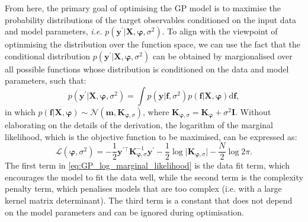 From here, the primary goal of optimising the GP model is to maximise the probability distributions of the target observables conditioned on the input data and model parameters, \emph{i.e.} $p(\bm{y}^\prime\vert \bm{X},\boldsymbol{\varphi},\sigma^2)$. To align with the viewpoint of optinmising the distribution over the function space, we can use the fact that the conditional distribution $p(\bm{y}^\prime\vert \bm{X},\boldsymbol{\varphi},\sigma^2)$ can be obtained by margionalised over all possible functions whose distribution is conditioned on the data and model parameters, such that:
\begin{equation}
    \label{eq:GP_marginal_likelihood}
    p(\bm{y}^\prime\vert \bm{X},\boldsymbol{\varphi},\sigma^2)=\int p(\bm{y}\vert\bm{f},\sigma^2)p(\bm{f}\vert\bm{X},\boldsymbol{\varphi})\mathrm{d}\bm{f},
\end{equation}
in which $p(\bm{f}\vert\bm{X},\boldsymbol{\varphi})\sim\mathcal{N}(\bm{m},\bm{K}_{\boldsymbol{\varphi},\sigma})$, where $\bm{K}_{\boldsymbol{\varphi},\sigma}=\bm{K}_{\boldsymbol{\varphi}}+\sigma^2\bm{I}$. Without elaborating on the details of the derivation,\cite{williams2006gaussian} the logarithm of the marginal likelihood, which is the objective function to be maximised, can be expressed as:
\begin{equation}    \label{eq:GP_log_marginal_likelihood}
    \mathcal{L}(\boldsymbol{\varphi},\sigma^2)=-\frac{1}{2}\bm{y}^{\prime\top}\bm{K}_{\boldsymbol{\varphi},\sigma}^{-1}\bm{y}^\prime-\frac{1}{2}\log\vert\bm{K}_{\boldsymbol{\varphi},\sigma}\vert-\frac{N}{2}\log 2\pi.
\end{equation}  
The first term in \cref{eq:GP_log_marginal_likelihood} is the data fit term, which encourages the model to fit the data well, while the second term is the complexity penalty term, which penalises models that are too complex (i.e. with a large kernel matrix determinant). The third term is a constant that does not depend on the model parameters and can be ignored during optimisation. 

